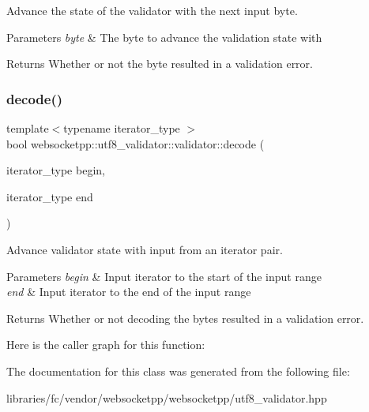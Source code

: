 Advance the state of the validator with the next input byte. 


\begin{DoxyParams}{Parameters}
{\em byte} & The byte to advance the validation state with \\
\hline
\end{DoxyParams}
\begin{DoxyReturn}{Returns}
Whether or not the byte resulted in a validation error. 
\end{DoxyReturn}
\mbox{\label{classwebsocketpp_1_1utf8__validator_1_1validator_a2cde6cad6f1a0f66674010848ec80fba}} 
\subsubsection{\texorpdfstring{decode()}{decode()}}
{\footnotesize\ttfamily template$<$typename iterator\+\_\+type $>$ \\
bool websocketpp\+::utf8\+\_\+validator\+::validator\+::decode (\begin{DoxyParamCaption}\item[{iterator\+\_\+type}]{begin,  }\item[{iterator\+\_\+type}]{end }\end{DoxyParamCaption})\hspace{0.3cm}{\ttfamily [inline]}}



Advance validator state with input from an iterator pair. 


\begin{DoxyParams}{Parameters}
{\em begin} & Input iterator to the start of the input range \\
\hline
{\em end} & Input iterator to the end of the input range \\
\hline
\end{DoxyParams}
\begin{DoxyReturn}{Returns}
Whether or not decoding the bytes resulted in a validation error. 
\end{DoxyReturn}
Here is the caller graph for this function\+:


The documentation for this class was generated from the following file\+:\begin{DoxyCompactItemize}
\item 
libraries/fc/vendor/websocketpp/websocketpp/utf8\+\_\+validator.\+hpp\end{DoxyCompactItemize}
